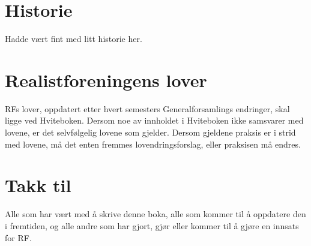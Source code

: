 \documentclass[11pt,norsk,a4paper,pointlessnumbers]{scrbook}
\begin{document}


\chapter{Historie}
Hadde vært fint med litt historie her.

\chapter{Realistforeningens lover}
RFs lover, oppdatert etter hvert semesters Generalforsamlings 
endringer, skal ligge ved Hviteboken. Dersom noe av innholdet
i Hviteboken ikke samsvarer med lovene, er det selvfølgelig
lovene som gjelder. Dersom gjeldene praksis er i strid med
lovene, må det enten fremmes lovendringsforslag, eller praksisen
må endres.


\chapter{Takk til}
Alle som har vært med å skrive denne boka, alle som kommer til å oppdatere den
i fremtiden, og alle andre som har gjort, gjør eller kommer til å gjøre en
innsats for RF.


%
\end{document}
